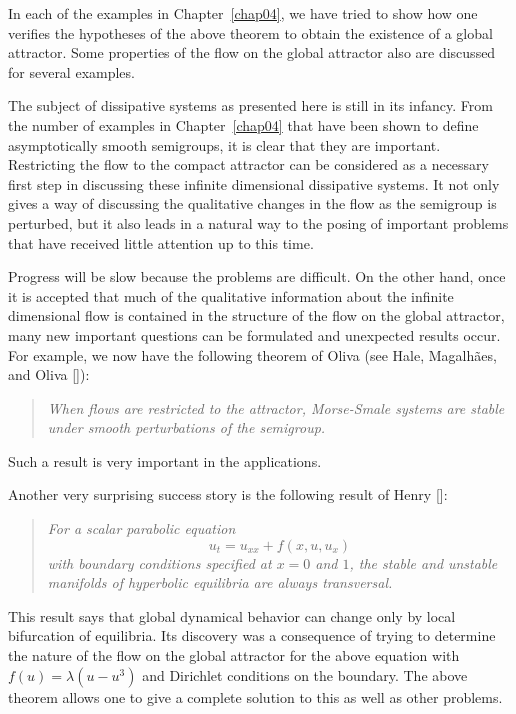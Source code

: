 \documentclass{surv-l}
\theoremstyle{plain}
\theoremstyle{definition}
\numberwithin{equation}{section}
\numberwithin{figure}{chapter}
\begin{document}
In each of the examples in Chapter~\ref{chap04}, we have tried to show how one verifies the hypotheses of the above theorem to obtain the existence of a global attractor. Some properties of the flow on the global attractor also are discussed for several examples.

The subject of dissipative systems as presented here is still in its infancy. From the number of examples in Chapter~\ref{chap04} that have been shown to define asymptotically smooth semigroups, it is clear that they are important. Restricting the flow to the compact attractor can be considered as a necessary first step in discussing these infinite dimensional dissipative systems. It not only gives a way of discussing the qualitative changes in the flow as the semigroup is perturbed, but it also leads in a natural way to the posing of important problems that have received little attention up to this time.

Progress will be slow because the problems are difficult. On the other hand, once it is accepted that much of the qualitative information about the infinite dimensional flow is contained in the structure of the flow on the global attractor, many new important questions can be formulated and unexpected results occur. For example, we now have the following theorem of Oliva (see Hale, Magalh\~{a}es, and Oliva [\citeyear{1984hmo}]):

\begin{quote}
\emph{When flows are restricted to the attractor, Morse-Smale systems}
\emph{are stable under smooth perturbations of the semigroup.}
\end{quote}
Such a result is very important in the applications.

Another very surprising success story is the following result of Henry [\citeyear{1985henry}]:

\begin{quote}
\emph{For a scalar parabolic equation}
\begin{equation*}
u_{t}=u_{xx}+f(x, u, u_{x})
\end{equation*}
\emph{with boundary conditions specified at $x=0$ and $1$, the stable and}
\emph{unstable manifolds of hyperbolic equilibria are always transversal.}
\end{quote}


This result says that global dynamical behavior can change only by local bifurcation of equilibria. Its discovery was a consequence of trying to determine the nature of the flow on the global attractor for the above equation with $f(u)= \lambda(u-u^{3})$ and Dirichlet conditions on the boundary. The above theorem allows one to give a complete solution to this as well as other problems.
\end{document}
